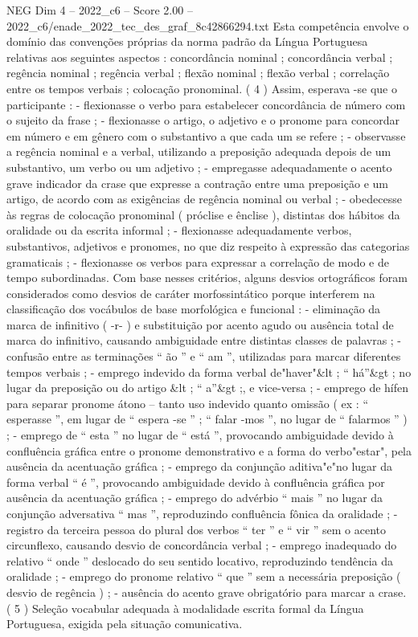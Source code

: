 \begin{textsample}{NEG Dim 4 – 2022\_c6 – Score 2.00 – 2022\_c6/enade\_2022\_tec\_des\_graf\_8c42866294.txt}
Esta competência envolve o domínio das convenções próprias da norma padrão da Língua Portuguesa relativas aos seguintes aspectos : concordância nominal ; concordância verbal ; regência nominal ; regência verbal ; flexão nominal ; flexão verbal ; correlação entre os tempos verbais ; colocação pronominal. ( 4 ) Assim, esperava -se que o participante : - flexionasse o verbo para estabelecer concordância de número com o sujeito da frase ; - flexionasse o artigo, o adjetivo e o pronome para concordar em número e em gênero com o substantivo a que cada um se refere ; - observasse a regência nominal e a verbal, utilizando a preposição adequada depois de um substantivo, um verbo ou um adjetivo ; - empregasse adequadamente o acento grave indicador da crase que expresse a contração entre uma preposição e um artigo, de acordo com as exigências de regência nominal ou verbal ; - obedecesse às regras de colocação pronominal ( próclise e ênclise ), distintas dos hábitos da oralidade ou da escrita informal ; - flexionasse adequadamente verbos, substantivos, adjetivos e pronomes, no que diz respeito à expressão das categorias gramaticais ; - flexionasse os verbos para expressar a correlação de modo e de tempo subordinadas.
Com base nesses critérios, alguns desvios ortográficos foram considerados como desvios de caráter morfossintático porque interferem na classificação dos vocábulos de base morfológica e funcional : - eliminação da marca de infinitivo ( -r- ) e substituição por acento agudo ou ausência total de marca do infinitivo, causando ambiguidade entre distintas classes de palavras ; - confusão entre as terminações “ ão ” e “ am ”, utilizadas para marcar diferentes tempos verbais ; - emprego indevido da forma verbal de"haver"\&lt ; “ há”\&gt ; no lugar da preposição ou do artigo \&lt ; “ a”\&gt ;, e vice-versa ; - emprego de hífen para separar pronome átono – tanto uso indevido quanto omissão ( ex : “ esperasse ”, em lugar de “ espera -se ” ; “ falar -mos ”, no lugar de “ falarmos ” ) ; - emprego de “ esta ” no lugar de “ está ”, provocando ambiguidade devido à confluência gráfica entre o pronome demonstrativo e a forma do verbo"estar", pela ausência da acentuação gráfica ; - emprego da conjunção aditiva"e"no lugar da forma verbal “ é ”, provocando ambiguidade devido à confluência gráfica por ausência da acentuação gráfica ; - emprego do advérbio “ mais ” no lugar da conjunção adversativa “ mas ”, reproduzindo confluência fônica da oralidade ; - registro da terceira pessoa do plural dos verbos “ ter ” e “ vir ” sem o acento circunflexo, causando desvio de concordância verbal ; - emprego inadequado do relativo “ onde ” deslocado do seu sentido locativo, reproduzindo tendência da oralidade ; - emprego do pronome relativo “ que ” sem a necessária preposição ( desvio de regência ) ; - ausência do acento grave obrigatório para marcar a crase. ( 5 ) Seleção vocabular adequada à modalidade escrita formal da Língua Portuguesa, exigida pela situação comunicativa.

\end{textsample}
